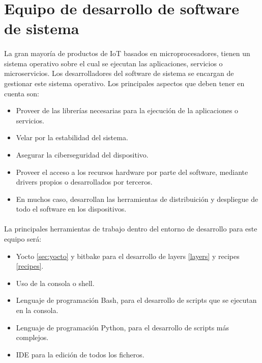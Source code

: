 \section{Equipo de desarrollo de software de sistema}

\paragraph{}La gran mayoría de productos de \gls{IoT} basados en microprocesadores,
tienen un sistema operativo sobre el cual se ejecutan las aplicaciones, servicios o
microservicios. Los desarrolladores del software de sistema se encargan de gestionar
este sistema operativo. Los principales aspectos que deben tener en cuenta son:

\begin{itemize}
    \item Proveer de las librerías necesarias para la ejecución de la aplicaciones o
    servicios.
    \item Velar por la estabilidad del sistema.
    \item Asegurar la ciberseguridad del dispositivo.
    \item Proveer el acceso a los recursos hardware por parte del software, mediante
    drivers propios o desarrollados por terceros.
    \item En muchos caso, desarrollan las herramientas de distribuición y despliegue
    de todo el software en los dispositivos.
\end{itemize}

\paragraph{}La principales herramientas de trabajo dentro del entorno de desarrollo para este equipo
será:

\begin{itemize}
    \item Yocto \ref{sec:yocto} y bitbake para el desarrollo de layers \ref{layers} y
    recipes \ref{recipes}.
    \item Uso de la consola o \gls{shell}.
    \item Lenguaje de programación Bash, para el desarrollo de \gls{scripts} que se
    ejecutan en la consola.
    \item Lenguaje de programación Python, para el desarrollo de \gls{scripts} más complejos.
    \item IDE para la edición de todos los ficheros.
\end{itemize}

